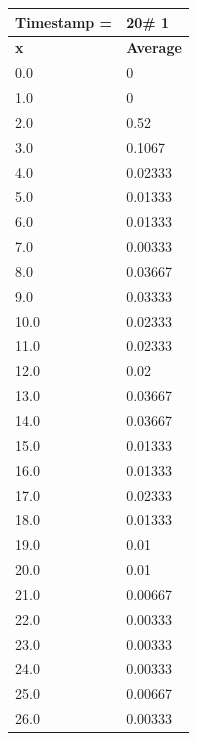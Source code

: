 \begin{tabular}{|l||l|}
\hline
\textbf{Timestamp =} & \textbf{20}\# 1\\\hline
	\textbf{x} & \textbf{Average} \\ \hline
\hline
	0.0 & 0 \\ \hline
	1.0 & 0 \\ \hline
	2.0 & 0.52 \\ \hline
	3.0 & 0.1067 \\ \hline
	4.0 & 0.02333 \\ \hline
	5.0 & 0.01333 \\ \hline
	6.0 & 0.01333 \\ \hline
	7.0 & 0.00333 \\ \hline
	8.0 & 0.03667 \\ \hline
	9.0 & 0.03333 \\ \hline
	10.0 & 0.02333 \\ \hline
	11.0 & 0.02333 \\ \hline
	12.0 & 0.02 \\ \hline
	13.0 & 0.03667 \\ \hline
	14.0 & 0.03667 \\ \hline
	15.0 & 0.01333 \\ \hline
	16.0 & 0.01333 \\ \hline
	17.0 & 0.02333 \\ \hline
	18.0 & 0.01333 \\ \hline
	19.0 & 0.01 \\ \hline
	20.0 & 0.01 \\ \hline
	21.0 & 0.00667 \\ \hline
	22.0 & 0.00333 \\ \hline
	23.0 & 0.00333 \\ \hline
	24.0 & 0.00333 \\ \hline
	25.0 & 0.00667 \\ \hline
	26.0 & 0.00333 \\ \hline
\end{tabular}
